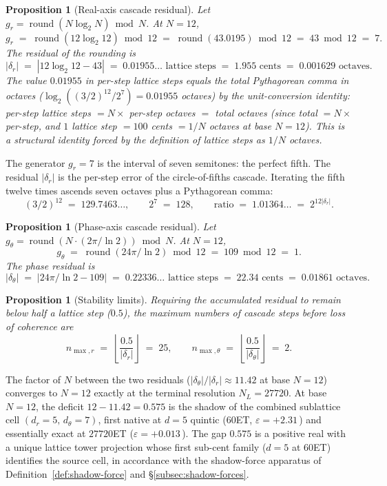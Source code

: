 \documentclass[11pt,a4paper]{article}
\newtheorem{proposition}[theorem]{Proposition}
\theoremstyle{definition}
\theoremstyle{remark}
\DeclareMathOperator{\round}{round}
\begin{document}
\begin{proposition}[Real-axis cascade residual]\label{prop:cascader}
Let $g_{r} = \round(N\log_{2}N)\bmod N$. At $N=12$,
\[
g_{r} \;=\; \round(12\log_{2}12)\bmod 12 \;=\; \round(43.0195)\bmod 12 \;=\; 43\bmod 12 \;=\; 7.
\]
The residual of the rounding is
\[
|\delta_{r}| \;=\; |12\log_{2}12 - 43| \;=\; 0.01955\ldots\text{ lattice steps} \;=\; 1.955\text{ cents} \;=\; 0.001629\text{ octaves}.
\]
The value $0.01955$ in per-step lattice steps equals the total Pythagorean comma in octaves ($\log_{2}((3/2)^{12}/2^{7}) = 0.01955$ octaves) by the unit-conversion identity: per-step lattice steps $= N \times$ per-step octaves $=$ total octaves (since total $= N \times$ per-step, and $1$ lattice step $= 100$ cents $= 1/N$ octaves at base $N=12$). This is a structural identity forced by the definition of lattice steps as $1/N$ octaves.
\end{proposition}

The generator $g_{r}=7$ is the interval of seven semitones: the perfect fifth. The residual $|\delta_{r}|$ is the per-step error of the circle-of-fifths cascade. Iterating the fifth twelve times ascends seven octaves plus a Pythagorean comma:
\[
(3/2)^{12} \;=\; 129.7463\ldots, \qquad 2^{7} \;=\; 128, \qquad \text{ratio} \;=\; 1.01364\ldots \;=\; 2^{12|\delta_{r}|}.
\]

\begin{proposition}[Phase-axis cascade residual]\label{prop:cascadetheta}
Let $g_{\theta} = \round(N\cdot (2\pi/\ln 2))\bmod N$. At $N=12$,
\[
g_{\theta} \;=\; \round(24\pi/\ln 2)\bmod 12 \;=\; 109\bmod 12 \;=\; 1.
\]
The phase residual is
\[
|\delta_{\theta}| \;=\; \bigl|24\pi/\ln 2 - 109\bigr| \;=\; 0.22336\ldots\text{ lattice steps} \;=\; 22.34\text{ cents} \;=\; 0.01861\text{ octaves}.
\]
\end{proposition}

\begin{proposition}[Stability limits]\label{prop:stability}
Requiring the accumulated residual to remain below half a lattice step ($0.5$), the maximum numbers of cascade steps before loss of coherence are
\[
n_{\max,r} \;=\; \left\lfloor\frac{0.5}{|\delta_{r}|}\right\rfloor \;=\; 25, \qquad
n_{\max,\theta} \;=\; \left\lfloor\frac{0.5}{|\delta_{\theta}|}\right\rfloor \;=\; 2.
\]
\end{proposition}

The factor of $N$ between the two residuals ($|\delta_{\theta}|/|\delta_{r}| \approx 11.42$ at base $N=12$) converges to $N=12$ exactly at the terminal resolution $N_{L}=27720$. At base $N=12$, the deficit $12 - 11.42 = 0.575$ is the shadow of the combined sublattice cell $(d_{r}=5,\,d_{\theta}=7)$, first native at $d=5$ quintic ($60$ET, $\varepsilon = +2.31$\,\textcent) and essentially exact at $27720$ET ($\varepsilon = +0.013$\,\textcent). The gap $0.575$ is a positive real with a unique lattice tower projection whose first sub-cent family ($d=5$ at $60$ET) identifies the source cell, in accordance with the shadow-force apparatus of Definition~\ref{def:shadow-force} and \S\ref{subsec:shadow-forces}.
\end{document}
